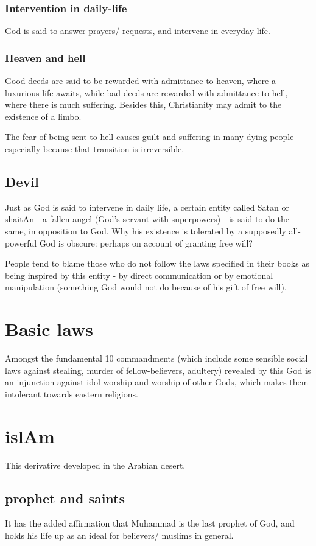 \documentclass[oneside, article]{memoir}
\begin{document}
\subsubsection{Intervention in daily-life}
God is said to answer prayers/ requests, and intervene in everyday life.

\subsubsection{Heaven and hell}
Good deeds are said to be rewarded with admittance to heaven, where a luxurious life awaits, while bad deeds are rewarded with admittance to hell, where there is much suffering. Besides this, Christianity may admit to the existence of a limbo.

The fear of being sent to hell causes guilt and suffering in many dying people - especially because that transition is irreversible.

\subsection{Devil}
Just as God is said to intervene in daily life, a certain entity called Satan or shaitAn - a fallen angel (God's servant with superpowers) - is said to do the same, in opposition to God. Why his existence is tolerated by a supposedly all-powerful God is obscure: perhaps on account of granting free will? \chk

People tend to blame those who do not follow the laws specified in their books as being inspired by this entity - by direct communication or by emotional manipulation (something God would not do because of his gift of free will).

\section{Basic laws}
Amongst the fundamental 10 commandments (which include some sensible social laws against stealing, murder of fellow-believers, adultery) revealed by this God is an injunction against idol-worship and worship of other Gods, which makes them intolerant towards eastern religions.

\section{islAm}
This derivative developed in the Arabian desert.

\subsection{prophet and saints}
It has the added affirmation that Muhammad is the last prophet of God, and holds his life up as an ideal for believers/ muslims in general.
\end{document}
